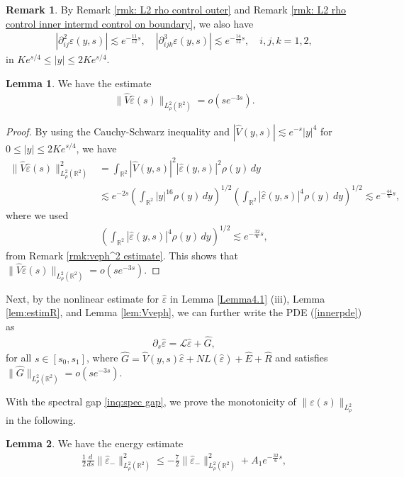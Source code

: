 \documentclass[11pt,reqno]{amsart}
\theoremstyle{definition}
\theoremstyle{bfremark}
\newtheorem{remark}{Remark}[section]
\newtheorem{lemma}{Lemma}[section]
\numberwithin{equation}{section}
\newcommand{\veph}{\hat\varepsilon }
\begin{document}
\begin{remark}
\label{rmk:partial ij varepslion}
    By Remark \ref{rmk: L2 rho control outer} and Remark \ref{rmk: L2 rho control inner intermd control on boundary}, we also have 
    \begin{align*}
             |\partial^2_{ij}\varepsilon(y,s)| \lesssim e^{-\frac{11}{12}s}, \quad
              |\partial^3_{ijk}\varepsilon(y,s)| \lesssim e^{-\frac{14}{12}s}, \quad i,j,k=1,2,
         \end{align*}
         in \(Ke^{s/4} \leq |y| \leq 2Ke^{s/4}\).
\end{remark}
\begin{lemma}
\label{lem:estm Vveph}
\label{lem:Vveph}
    We have the estimate 
    \begin{align*}
        \|\hat{V}\veph(s)\|_{L^2_{\rho}(\mathbb{R}^2)}=o(se^{-3s}).
    \end{align*}
\end{lemma}
\begin{proof}
    By using the Cauchy-Schwarz inequality and \(|\hat{V}(y,s)| \lesssim e^{-s}|y|^4\) for \(0 \leq |y| \leq 2Ke^{s/4}\), we have 
    \begin{align*}
        \|\hat{V}\veph(s)\|^2_{L^2_{\rho}(\mathbb{R}^2)}&=\int_{\mathbb{R}^2}|\hat{V}(y,s)|^2|\veph(y,s)|^2\rho(y)\,dy\\
        & \lesssim e^{-2s}\left(\int_{\mathbb{R}^2}|y|^{16}\rho(y)\,dy\right)^{1/2}\left(\int_{\mathbb{R}^2}|\veph(y,s)|^4\rho(y)\,dy\right)^{1/2} \lesssim e^{-\frac{44}{6}s},
    \end{align*}
where we used
    \begin{align*}
    \left(\int_{\mathbb{R}^2}|\veph(y,s)|^4\rho(y)\,dy\right)^{1/2} \lesssim e^{-\frac{32}{6}s},
    \end{align*}
from Remark \ref{rmk:veph^2 estimate}. This shows that \(\|\hat{V}\veph(s)\|_{L^2_{\rho}(\mathbb{R}^2)}=o(se^{-3s})\).
\end{proof}
Next, by the nonlinear estimate for \(\veph\) in Lemma \ref{Lemma4.1} (iii), Lemma \ref{lem:estimR}, and Lemma \ref{lem:Vveph}, we can further write the PDE (\ref{innerpde}) as
\begin{align}
    \partial_s\veph=\mathcal{L}\veph +\hat{G},\label{innerpdered}
\end{align}
for all \(s \in [s_0,s_1]\), where \(\hat{G}=\hat{V}(y,s)\veph+NL(\veph)+\hat{E}+\hat{R}\) and satisfies \(\|\hat{G}\|_{L^2_{\rho}(\mathbb{R}^2)}=o(se^{-3s})\).

With the spectral gap \ref{inq:spec gap}, we prove the monotonicity of $\|\varepsilon(s)\|_{L^2_\rho}$ in the following.
\begin{lemma}
\label{Lemma 5.2}
    We have the energy estimate
    \begin{align}
        \frac{1}{2}\frac{d}{ds}\|\veph_-\|^2_{L^2_{\rho}(\mathbb{R}^2)} \leq -\frac{7}{2}\|\veph_-\|^2_{L^2_{\rho}(\mathbb{R}^2)}+A_1 e^{-\frac{32}{6}s},\label{en1}
  \end{align}
  \end{lemma}
\end{document}
